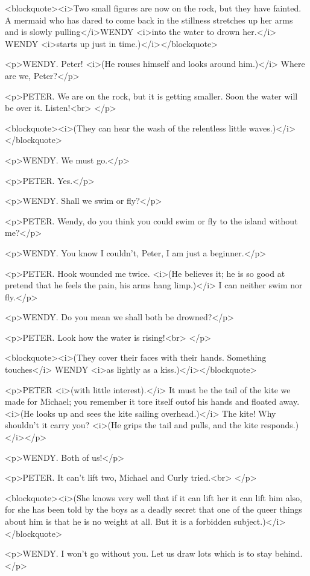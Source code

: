 <blockquote><i>Two small figures are now on the rock, but they have
fainted. A mermaid who has dared to come back in the stillness
stretches up her arms and is slowly pulling</i>WENDY <i>into the
water to drown her.</i> WENDY <i>starts up just in
time.)</i></blockquote>

<p>WENDY. Peter! <i>(He rouses himself and looks around him.)</i>
Where are we, Peter?</p>

<p>PETER. We are on the rock, but it is getting smaller. Soon the
water will be over it. Listen!<br>
</p>

<blockquote><i>(They can hear the wash of the relentless little
waves.)</i></blockquote>

<p>WENDY. We must go.</p>

<p>PETER. Yes.</p>

<p>WENDY. Shall we swim or fly?</p>

<p>PETER. Wendy, do you think you could swim or fly to the island
without me?</p>

<p>WENDY. You know I couldn't, Peter, I am just a beginner.</p>

<p>PETER. Hook wounded me twice. <i>(He believes it; he is so good at
pretend that he feels the pain, his arms hang limp.)</i> I can
neither swim nor fly.</p>

<p>WENDY. Do you mean we shall both be drowned?</p>

<p>PETER. Look how the water is rising!<br>
</p>

<blockquote><i>(They cover their faces with their hands. Something
touches</i> WENDY <i>as lightly as a kiss.)</i></blockquote>

<p>PETER <i>(with little interest).</i> It must be the tail of the
kite we made for Michael; you remember it tore itself outof his hands
and floated away. <i>(He looks up and sees the kite sailing
overhead.)</i> The kite! Why shouldn't it carry you? <i>(He grips the
tail and pulls, and the kite responds.)</i></p>

<p>WENDY. Both of us!</p>

<p>PETER. It can't lift two, Michael and Curly tried.<br>
</p>

<blockquote><i>(She knows very well that if it can lift her it can
lift him also, for she has been told by the boys as a deadly secret
that one of the queer things about him is that he is no weight at
all. But it is a forbidden subject.)</i></blockquote>

<p>WENDY. I won't go without you. Let us draw lots which is to stay
behind.</p>

